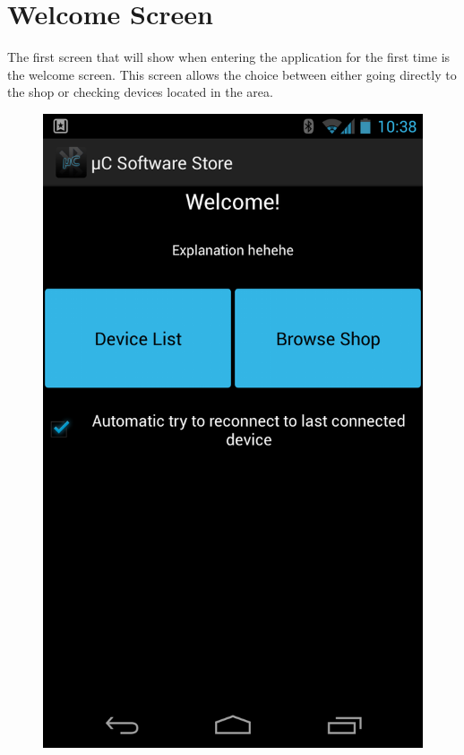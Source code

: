 \chapter{Welcome Screen}
The first screen that will show when entering the application for the first time is the welcome screen. This screen allows the choice between either going directly to the shop or checking devices located in the area. \\
\newline
\begin{figure}[H]
	\centering
	\includegraphics[scale = 0.3]{images/Screenshots/welcome_screen.png}
\end{figure}

